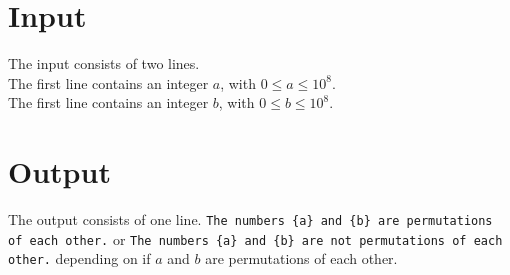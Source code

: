 \section*{Input}
The input consists of two lines.\\
The first line contains an integer $a$, with $0 \leq a \leq 10^8$.\\
The first line contains an integer $b$, with $0 \leq b \leq 10^8$.

\section*{Output}
The output consists of one line.
\texttt{The numbers \{a\} and \{b\} are permutations of each other.}
or
\texttt{The numbers \{a\} and \{b\} are not permutations of each other.}
depending on if $a$ and $b$ are permutations of each other.
